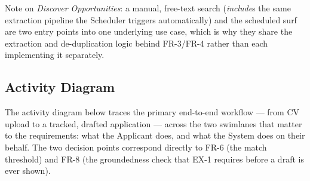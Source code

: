 \documentclass[11pt,a4paper]{article}
\begin{document}
\noindent Note on \emph{Discover Opportunities}: a manual, free-text search
(\emph{include}s the same extraction pipeline the Scheduler triggers automatically) and the
scheduled surf are two entry points into one underlying use case, which is why they share the
extraction and de-duplication logic behind FR-3/FR-4 rather than each implementing it
separately.

\subsection{Activity Diagram}
The activity diagram below traces the primary end-to-end workflow --- from CV upload to a
tracked, drafted application --- across the two swimlanes that matter to the requirements:
what the Applicant does, and what the System does on their behalf. The two decision points
correspond directly to FR-6 (the match threshold) and FR-8 (the groundedness check that
EX-1 requires before a draft is ever shown).

\end{document}
